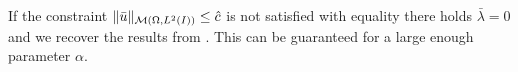 \begin{rmk}
If the constraint $\|\bar u\|_{\mathcal{M}(\Omega, L^{2}(I))}\leq \hat c$ is not satisfied with equality there holds $\bar \lambda=0$ and we recover the results from \cite{pieper2014}. This can be guaranteed for a large enough parameter $\alpha$.
\end{rmk}
%


